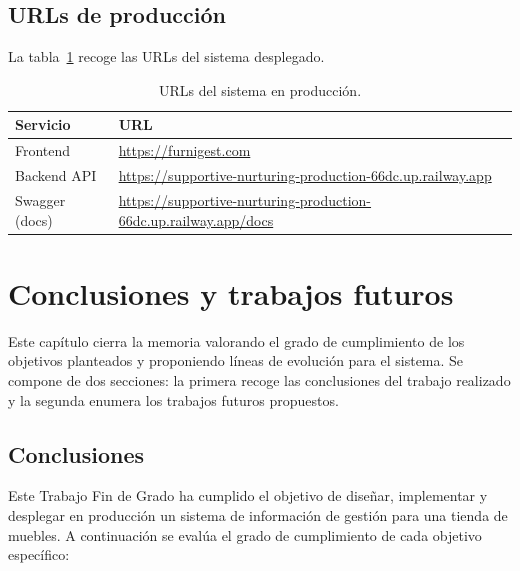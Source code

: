 \documentclass[12pt,twoside,titlepage]{report}
\begin{document}
\section{URLs de producción}

La tabla~\ref{tab:urls} recoge las URLs del sistema desplegado.

\begin{table}[H]
  \centering
  \caption{URLs del sistema en producción.}
  \label{tab:urls}
  \begin{tabularx}{\textwidth}{lX}
    \toprule
    \textbf{Servicio} & \textbf{URL} \\
    \midrule
    Frontend      & \url{https://furnigest.com} \\
    Backend API   & \url{https://supportive-nurturing-production-66dc.up.railway.app} \\
    Swagger (docs)& \url{https://supportive-nurturing-production-66dc.up.railway.app/docs} \\
    \bottomrule
  \end{tabularx}
\end{table}


%
%
\chapter{Conclusiones y trabajos futuros}

Este capítulo cierra la memoria valorando el grado de cumplimiento de los objetivos planteados y proponiendo líneas de evolución para el sistema. Se compone de dos secciones: la primera recoge las conclusiones del trabajo realizado y la segunda enumera los trabajos futuros propuestos.

\section{Conclusiones}

Este Trabajo Fin de Grado ha cumplido el objetivo de diseñar, implementar y desplegar en producción un sistema de información de gestión para una tienda de muebles. A continuación se evalúa el grado de cumplimiento de cada objetivo específico:
\end{document}
